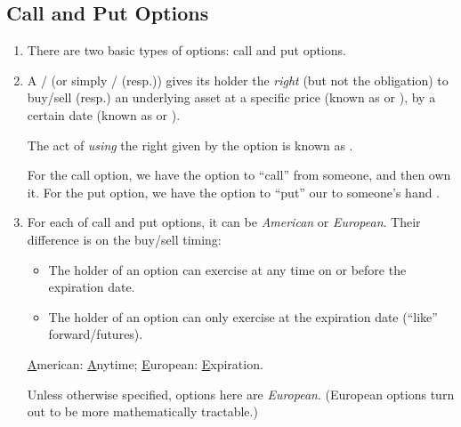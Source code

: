 \subsection{Call and Put Options}
\begin{enumerate}
\item There are two basic types of options: call and put options.

\item A / (or simply /
(resp.))  gives its holder the \emph{right} (but not the
obligation) to buy/sell (resp.) an underlying asset  at a
specific price (known as  or ), by a
certain date (known as  or ).

\begin{note}
The act of \emph{using} the right given by the option is known as
.
\end{note}

\begin{mnemonic}
For the call option, we have the option to ``call''  from
someone, and then own it. For the put option, we have the option to ``put'' our
 to someone's hand .
\end{mnemonic}

\item For each of call and put options, it can be \emph{American} or
\emph{European}. Their difference is on the buy/sell timing:
\begin{itemize}
\item The holder of an  option can exercise at any time on or before the expiration date.
\item The holder of an  option can only exercise at the expiration date (``like'' forward/futures).
\end{itemize}
\begin{mnemonic}
\underline{A}merican: \underline{A}nytime; \underline{E}uropean: \underline{E}xpiration.
\end{mnemonic}

\begin{note}
Unless otherwise specified, options here are \emph{European}. (European options
turn out to be more mathematically tractable.)
\end{note}


\end{enumerate}

